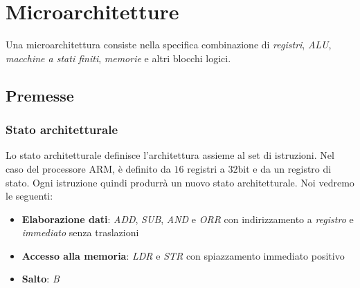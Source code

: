 \newpage
\section{Microarchitetture}
Una microarchitettura consiste nella specifica combinazione di \textit{registri}, \textit{ALU}, \textit{macchine a stati finiti}, \textit{memorie} e altri blocchi logici.
\subsection{Premesse}
\subsubsection{Stato architetturale}
Lo stato architetturale definisce l'architettura assieme al set di istruzioni. Nel caso del processore ARM, è definito da $16$ registri a $32$bit e da un registro di stato. Ogni istruzione quindi produrrà un nuovo stato architetturale. Noi vedremo le seguenti:
\begin{itemize}
	\item \textbf{Elaborazione dati}: \textit{ADD}, \textit{SUB}, \textit{AND} e \textit{ORR} con indirizzamento a \textit{registro} e \textit{immediato} senza traslazioni
	\item \textbf{Accesso alla memoria}: \textit{LDR} e \textit{STR} con spiazzamento immediato positivo
	\item \textbf{Salto}: \textit{B}
\end{itemize}


